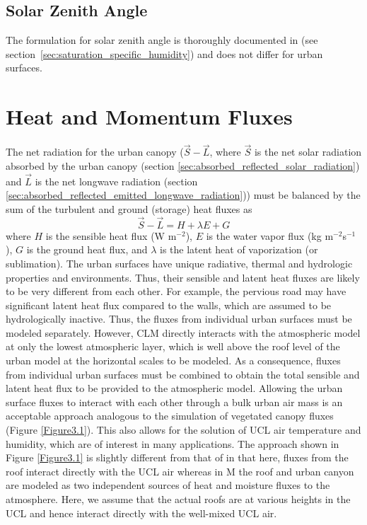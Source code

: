 \documentclass[12pt,authoryear]{elsarticle}
\numberwithin{equation}{section} %
\begin{document}
\subsection{Solar Zenith Angle}
\label{sec:solar_zenith_angle}
%
The formulation for solar zenith angle is thoroughly documented in \cite{OLESONETAL10} (see section~\ref{sec:saturation_specific_humidity}) and does not differ for urban surfaces.

\section{Heat and Momentum Fluxes}
\label{sec:heat_momentum_flux}
%
The net radiation for the urban canopy ($\vec{S}-\vec{L}$, where $\vec{S}$ is the net solar radiation absorbed by the urban canopy (section \ref{sec:absorbed_reflected_solar_radiation}) and $\vec{L}$ is the net longwave radiation (section \ref{sec:absorbed_reflected_emitted_longwave_radiation})) must be balanced by the sum of the turbulent and ground (storage) heat fluxes as 
\begin{equation}
\vec{S}-\vec{L}=H+\lambda E+G
\end{equation}
where $H$ is the sensible heat flux (W m$^{-2}$), $E$ is the water vapor flux (kg m$^{-2}$s$^{-1}$), $G$ is the ground heat flux, and $\lambda$ is the latent heat of vaporization (or sublimation). The urban surfaces have unique radiative, thermal and hydrologic properties and environments.
Thus, their sensible and latent heat fluxes are likely to be very different from each other. For example, the pervious road may have significant latent heat flux compared to the walls, which are assumed to be hydrologically inactive. Thus, the fluxes from individual urban surfaces must be modeled separately. However, CLM directly interacts with the atmospheric model at only the lowest atmospheric layer, which is well above the roof level of the urban model at the horizontal scales to be modeled. As a consequence, fluxes from individual urban surfaces must be combined to obtain the total sensible and latent heat flux to be provided to the atmospheric model. Allowing the urban surface fluxes to interact with each other through a bulk urban air mass is an acceptable approach analogous to the simulation of vegetated canopy fluxes (Figure \ref{Figure3.1}). This also allows for the solution of UCL air temperature and humidity, which are of interest in many applications. The approach shown in Figure \ref{Figure3.1} is slightly different from that of \cite{massonPhysicallyBasedSchemeUrban2000} in that here, fluxes from the roof interact directly with the UCL air whereas in M\cite{massonPhysicallyBasedSchemeUrban2000} the roof and urban canyon are modeled as two independent sources of heat and moisture fluxes to the atmosphere. Here, we assume that the actual roofs are at various heights in the UCL and hence interact directly with the well-mixed UCL air.
\end{document}

